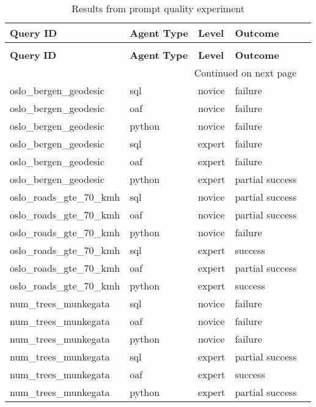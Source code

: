 \begin{longtable}{lp{1.8cm}p{1.8cm}p{1.8cm}p{2.5cm}}
\caption{Results from prompt quality experiment} \label{tbl:test-results-prompt-levels} \\
\toprule
\textbf{Query} \textbf{ID} & \textbf{Agent} \textbf{Type} & \textbf{Level} & \textbf{Outcome} \\
\midrule
\endfirsthead
\caption[]{Results from prompt quality experiment} \\
\toprule
\textbf{Query} \textbf{ID} & \textbf{Agent} \textbf{Type} & \textbf{Level} & \textbf{Outcome} \\
\midrule
\endhead
\midrule
\multicolumn{4}{r}{Continued on next page} \\
\midrule
\endfoot
\bottomrule
\endlastfoot
oslo\_bergen\_geodesic & sql  & novice & failure \\
oslo\_bergen\_geodesic & oaf & novice & failure \\
oslo\_bergen\_geodesic & python & novice & failure \\
oslo\_bergen\_geodesic & sql  & expert & failure \\
oslo\_bergen\_geodesic & oaf & expert & failure \\
oslo\_bergen\_geodesic & python & expert & partial success \\
oslo\_roads\_gte\_70\_kmh & sql  & novice & partial success \\
oslo\_roads\_gte\_70\_kmh & oaf & novice & partial success \\
oslo\_roads\_gte\_70\_kmh & python & novice & failure \\
oslo\_roads\_gte\_70\_kmh & sql  & expert & success \\
oslo\_roads\_gte\_70\_kmh & oaf & expert & partial success \\
oslo\_roads\_gte\_70\_kmh & python & expert & success \\
num\_trees\_munkegata & sql  & novice & failure \\
num\_trees\_munkegata & oaf & novice & failure \\
num\_trees\_munkegata & python & novice & failure \\
num\_trees\_munkegata & sql  & expert & partial success \\
num\_trees\_munkegata & oaf & expert & success \\
num\_trees\_munkegata & python & expert & partial success \\
\end{longtable}

